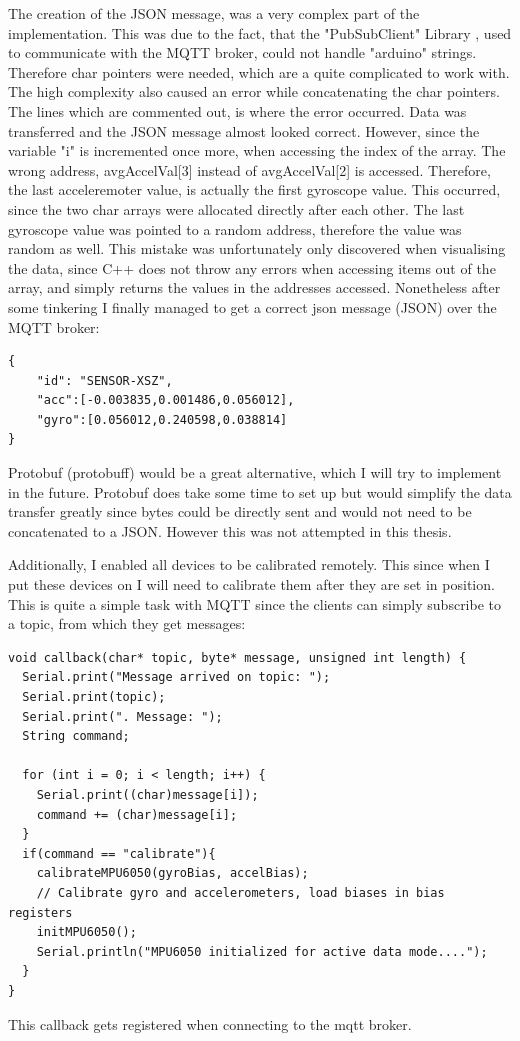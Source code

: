 The creation of the JSON message, was a very complex part of the implementation. This was due to the fact, that the "PubSubClient" Library \cite{knollear26:online}, used to communicate with the MQTT broker, could not handle "arduino" strings. Therefore char pointers were needed, which are a quite complicated to work with. The high complexity also caused an error while concatenating the char pointers. The lines which are commented out, is where the error occurred. Data was transferred and the JSON message almost looked correct. However, since the variable "i" is incremented once more, when accessing the index of the array. The wrong address, avgAccelVal[3] instead of avgAccelVal[2] is accessed. Therefore, the last acceleremoter value, is actually the first gyroscope value. This occurred, since the two char arrays were allocated directly after each other. The last gyroscope value was pointed to a random address, therefore the value was random as well. 
This mistake was unfortunately only discovered when visualising the data, since C++ does not throw any errors when accessing items out of the array, and simply returns the values in the addresses accessed.
Nonetheless after some tinkering I finally managed to get a correct \acrshort{json} message (\gls{JSON}) over the MQTT broker:

\begin{lstlisting}
{ 
    "id": "SENSOR-XSZ", 
    "acc":[-0.003835,0.001486,0.056012],
    "gyro":[0.056012,0.240598,0.038814]
}
\end{lstlisting}

\gls{Protobuf} (\acrshort{protobuff}) would be a great alternative, which I will try to implement in the future. Protobuf does take some time to set up but would simplify the data transfer greatly since bytes could be directly sent and would not need to be concatenated to a JSON. However this was not attempted in this thesis. 

Additionally, I enabled all devices to be calibrated remotely. This since when I put these devices on I will need to calibrate them after they are set in position. This is quite a simple task with MQTT since the clients can simply subscribe to a topic, from which they get messages: 

\begin{lstlisting}
void callback(char* topic, byte* message, unsigned int length) {
  Serial.print("Message arrived on topic: ");
  Serial.print(topic);
  Serial.print(". Message: ");
  String command;
  
  for (int i = 0; i < length; i++) {
    Serial.print((char)message[i]);
    command += (char)message[i];
  }
  if(command == "calibrate"){
    calibrateMPU6050(gyroBias, accelBias); 
    // Calibrate gyro and accelerometers, load biases in bias registers  
    initMPU6050(); 
    Serial.println("MPU6050 initialized for active data mode....");
  }
}
\end{lstlisting}
This callback gets registered when connecting to the mqtt broker.

